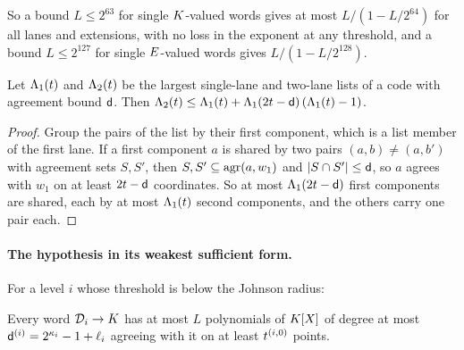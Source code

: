 So a bound $L\le2^{63}$ for single $K$-valued words gives at most $L/(1-L/2^{64})$ for all lanes and extensions, with no loss in the exponent at any threshold, and a bound $L\le2^{127}$ for single $E$-valued words gives $L/(1-L/2^{128})$.

\begin{proposition}\label{prop:two}
Let $\Lambda_1(t)$ and $\Lambda_2(t)$ be the largest single-lane and two-lane lists of a code with agreement bound $\mathsf{d}$. Then $\Lambda_2(t)\le\Lambda_1(t)+\Lambda_1(2t-\mathsf{d})\,(\Lambda_1(t)-1)$.
\end{proposition}
\begin{proof}
Group the pairs of the list by their first component, which is a list member of the first lane. If a first component $a$ is shared by two pairs $(a,b)\ne(a,b')$ with agreement sets $S,S'$, then $S,S'\subseteq\operatorname{agr}(a,w_1)$ and $|S\cap S'|\le\mathsf{d}$, so $a$ agrees with $w_1$ on at least $2t-\mathsf{d}$ coordinates. So at most $\Lambda_1(2t-\mathsf{d})$ first components are shared, each by at most $\Lambda_1(t)$ second components, and the others carry one pair each.
\end{proof}

\paragraph{The hypothesis in its weakest sufficient form.} For a level $i$ whose threshold is below the Johnson radius:

\begin{hypothesis}[$\HK(i;L)$]\label{hyp:HK}
Every word $\mathcal{D}_i\to K$ has at most $L$ polynomials of $K[X]$ of degree at most $\mathsf{d}^{(i)}=2^{\kappa_i}-1+\ell_i$ agreeing with it on at least $t^{(i,0)}$ points.
\end{hypothesis}

